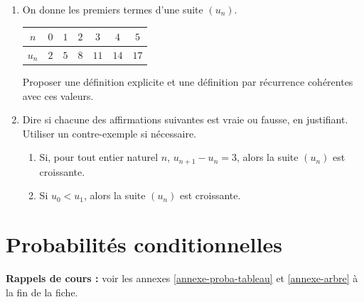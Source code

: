 \documentclass[10pt,a4paper]{article}
\begin{document}
\begin{bloc}
\begin{exo}[][appro]
\begin{enumerate}[leftmargin=*]
    \item On donne les premiers termes d'une suite \((u_n)\).

    \begin{center}
    \renewcommand{\arraystretch}{1.5}
    \begin{tabular}{|c|c|c|c|c|c|c|}
        \hline
        \(n\) & \(0\) & \(1\) & \(2\) & \(3\) & \(4\) & \(5\) \\ \hline
        \(u_n\) & \(2\) & \(5\) & \(8\) & \(11\) & \(14\) & \(17\) \\ \hline
    \end{tabular}
    \end{center}
    Proposer une définition explicite et une définition par récurrence cohérentes avec ces valeurs.
    \item Dire si chacune des affirmations suivantes est vraie ou fausse, en justifiant. Utiliser un contre-exemple si nécessaire.
    \begin{enumerate}
        \item Si, pour tout entier naturel \(n\), \(u_{n+1}-u_n=3\), alors la suite \((u_n)\) est croissante.
        \item Si \(u_0<u_1\), alors la suite \((u_n)\) est croissante.
    \end{enumerate}
\end{enumerate}
\end{exo}
\end{bloc}


\section{Probabilités conditionnelles}

\textbf{Rappels de cours :} voir les annexes \ref{annexe-proba-tableau} et \ref{annexe-arbre} à la fin de la fiche.
\nopagebreak
\end{document}
